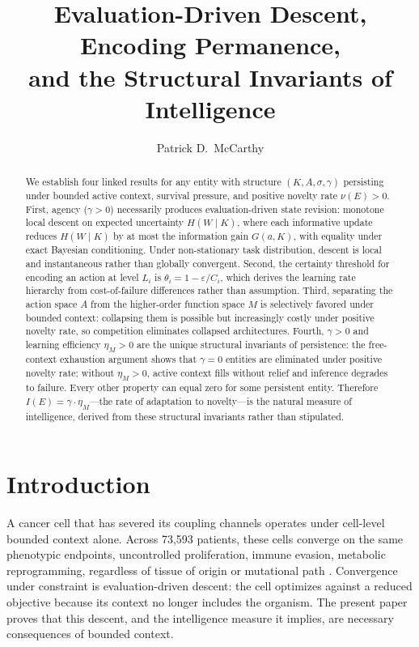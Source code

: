 \documentclass[11pt]{article}
\title{Evaluation-Driven Descent, Encoding Permanence,\\and the Structural Invariants of Intelligence}
\author{Patrick D.\ McCarthy}
\date{}
\theoremstyle{definition}
\theoremstyle{remark}
\begin{document}
\maketitle

\begin{abstract}
We establish four linked results for any entity with structure
$(K, A, \sigma, \gamma)$ persisting under bounded active context,
survival pressure, and positive novelty rate $\nu(E) > 0$.
First, agency ($\gamma > 0$) necessarily produces evaluation-driven
state revision: monotone local descent on expected uncertainty
$H(W \mid K)$, where each informative update reduces $H(W \mid K)$
by at most the information gain $G(a, K)$, with equality under exact
Bayesian conditioning. Under non-stationary task distribution,
descent is local and instantaneous rather than globally convergent.
Second, the certainty threshold for encoding an action at level $L_i$
is $\theta_i = 1 - \varepsilon / C_i$, which derives the learning
rate hierarchy from cost-of-failure differences rather than
assumption.
Third, separating the action space $A$ from the higher-order function
space $M$ is selectively favored under bounded context: collapsing them
is possible but increasingly costly under positive novelty rate, so
competition eliminates collapsed architectures.
Fourth, $\gamma > 0$ and learning efficiency $\eta_M > 0$ are the
unique structural invariants of persistence: the free-context
exhaustion argument shows that $\gamma = 0$ entities are eliminated
under positive novelty rate; without $\eta_M > 0$, active context
fills without relief and inference degrades to failure. Every other
property can equal zero for some persistent entity. Therefore
$I(E) = \gamma \cdot \eta_M$---the rate of adaptation to novelty---is
the natural measure of intelligence, derived from these structural
invariants rather than stipulated.
\end{abstract}

\section{Introduction}
\label{sec:intro}

A cancer cell that has severed its coupling channels operates under
cell-level bounded context alone. Across 73,593 patients, these cells
converge on the same phenotypic endpoints, uncontrolled proliferation,
immune evasion, metabolic reprogramming, regardless of tissue of origin
or mutational path \cite{McCarthy2026e}. Convergence under constraint is
evaluation-driven descent: the cell optimizes against a reduced
objective because its context no longer includes the organism.
The present paper proves that this descent, and the intelligence
measure it implies, are necessary consequences of bounded context.
\end{document}
